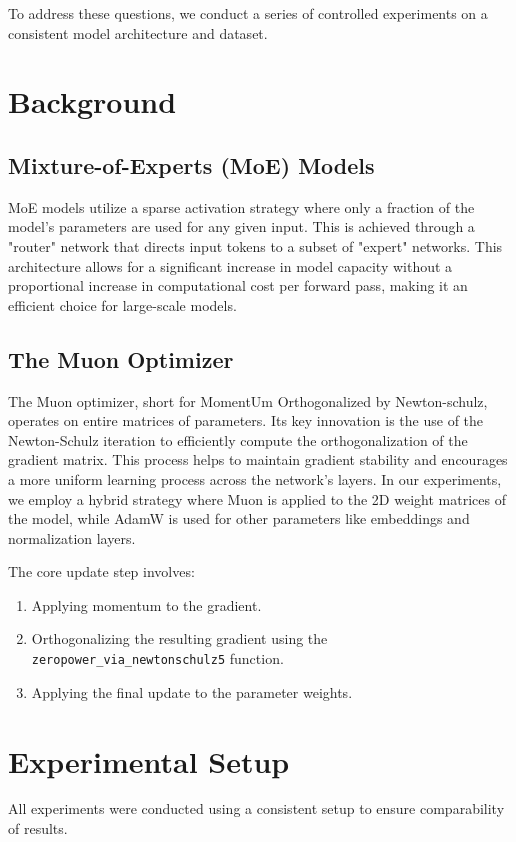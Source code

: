\documentclass[11pt, a4paper]{article}
\begin{document}
To address these questions, we conduct a series of controlled experiments on a consistent model architecture and dataset.

\section{Background}
\subsection{Mixture-of-Experts (MoE) Models}
MoE models utilize a sparse activation strategy where only a fraction of the model's parameters are used for any given input. This is achieved through a "router" network that directs input tokens to a subset of "expert" networks. This architecture allows for a significant increase in model capacity without a proportional increase in computational cost per forward pass, making it an efficient choice for large-scale models.

\subsection{The Muon Optimizer}
The Muon optimizer, short for MomentUm Orthogonalized by Newton-schulz, operates on entire matrices of parameters. Its key innovation is the use of the Newton-Schulz iteration to efficiently compute the orthogonalization of the gradient matrix. This process helps to maintain gradient stability and encourages a more uniform learning process across the network's layers. In our experiments, we employ a hybrid strategy where Muon is applied to the 2D weight matrices of the model, while AdamW is used for other parameters like embeddings and normalization layers.

The core update step involves:
\begin{enumerate}
    \item Applying momentum to the gradient.
    \item Orthogonalizing the resulting gradient using the \texttt{zeropower\_via\_newtonschulz5} function.
    \item Applying the final update to the parameter weights.
\end{enumerate}

\section{Experimental Setup}
All experiments were conducted using a consistent setup to ensure comparability of results.
\end{document}
